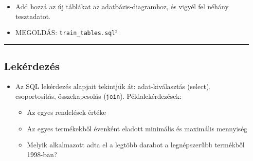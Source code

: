 \documentclass[
  magyar,
]{article}
\providecommand{\tightlist}{%
  \setlength{\itemsep}{0pt}\setlength{\parskip}{0pt}}
\begin{document}
\begin{itemize}
\begin{itemize}
    \begin{quote}
    \emph{Az alkalmazottainkat rendszeres képzésekre küldjük, ahol
    különböző készségeket sajátítanak el. A képzéseket szerződött
    harmadik fél cégek szervezik. Minden foglalkoztatási kategóriához
    (pl. „értékesítési vezető'', lásd \texttt{Employees.Title}) van egy
    listánk az elvárt készségekről (pl. „B szintű üzleti prezentáció''
    vagy „számviteli alapismeretek''), amelyeket a munkaviszony
    megkezdésétől számított 10 éven belül kell elsajátítani. Minden
    képzéshez tároljuk az időtartamot (kezdési és befejezési dátum), a
    helyszínt, a szervező céget, az oktatott készségeket, a
    résztvevőket, a képzési állapotukat (pl. „beiratkozott'',
    „elkezdett'', „befejezett'', „megszakított'') és vizsgaeredményeiket
    az egyes készségek vonatkozásában. A képzéseket szervező cégek
    tekintetében tároljuk a cégünk által az egyes képzési
    foglalkozásokért évente fizetett díjakat.}
    \end{quote}
  \item
    Add hozzá az új táblákat az adatbázis-diagramhoz, és vigyél fel
    néhány tesztadatot.
  \item
    MEGOLDÁS: \texttt{train\_tables.sql}²
  \end{itemize}
\end{itemize}

\begin{center}\rule{0.5\linewidth}{0.5pt}\end{center}

\subsection{Lekérdezés}\label{lekuxe9rdezuxe9s}

\begin{itemize}
\tightlist
\item
  Az SQL lekérdezés alapjait tekintjük át: adat-kiválasztás (select),
  csoportosítás, összekapcsolás (\texttt{join}). Példalekérdezések:

  \begin{itemize}
  \tightlist
  \item
    Az egyes rendelések értéke
  \item
    Az egyes termékekből évenként eladott minimális és maximális
    mennyiség
  \item
    Melyik alkalmazott adta el a legtöbb darabot a legnépszerűbb
    termékből 1998-ban?
  \end{itemize}
\end{itemize}
\end{document}

